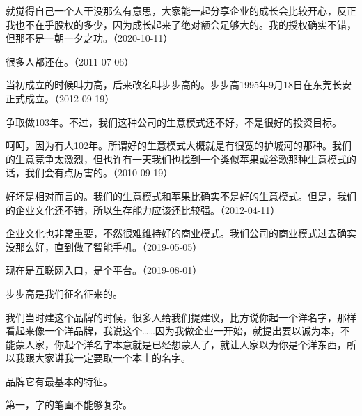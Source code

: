 
就觉得自己一个人干没那么有意思，大家能一起分享企业的成长会比较开心，反正我也不在乎股权的多少，因为成长起来了绝对额会足够大的。我的授权确实不错，但那不是一朝一夕之功。（2020-10-11）


很多人都还在。（2011-07-06）

当初成立的时候叫力高，后来改名叫步步高的。步步高1995年9月18日在东莞长安正式成立。（2012-09-19）


争取做103年。不过，我们这种公司的生意模式还不好，不是很好的投资目标。


呵呵，因为有人102年。所谓好的生意模式大概就是有很宽的护城河的那种。我们的生意竞争太激烈，但也许有一天我们也找到一个类似苹果或谷歌那种生意模式的话，我们会有点厉害的。（2010-09-19）


好坏是相对而言的。我们的生意模式和苹果比确实不是好的生意模式。但是，我们的企业文化还不错，所以生存能力应该还比较强。（2012-04-11）


企业文化也非常重要，不然很难维持好的商业模式。我们公司的商业模式过去确实没那么好，直到做了智能手机。（2019-05-05）


现在是互联网入口，是个平台。（2019-08-01）


步步高是我们征名征来的。

我们当时建这个品牌的时候，很多人给我们提建议，比方说你起一个洋名字，那样看起来像一个洋品牌，我说这个……因为我做企业一开始，就提出要以诚为本，不能蒙人家，你起个洋名字本意就是已经想蒙人了，就让人家以为你是个洋东西，所以我跟大家讲我一定要取一个本土的名字。

品牌它有最基本的特征。

第一，字的笔画不能够复杂。

